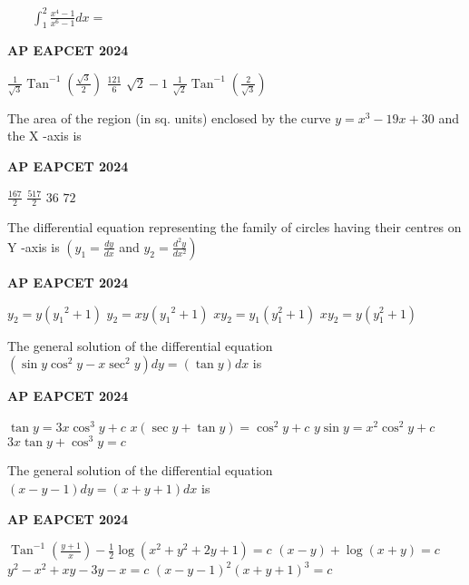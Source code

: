 \documentclass[11pt,paper=a4,answers]{exam}
\begin{document}
\begin{multicols}{2}
\begin{questions}
$\begin{aligned} & \\ &  \\ & \\ & \end{aligned}$
\question
$\int_1^2 \frac{x^4-1}{x^6-1} d x=$
\begin{flushright}
\small\textbf{AP EAPCET 2024}
\end{flushright}
\begin{choices}
  \choice $\frac{1}{\sqrt{3}} \operatorname{Tan}^{-1}\left(\frac{\sqrt{3}}{2}\right)$
  \choice $\frac{121}{6} $ 
  \choice $\sqrt{2}-1$ 
  \choice $\frac{1}{\sqrt{2}} \operatorname{Tan}^{-1}\left(\frac{2}{\sqrt{3}}\right)$
\end{choices}

\question
The area of the region (in sq. units) enclosed by the curve $y=x^3-19 x+30$ and the X -axis is
\begin{flushright}
\small\textbf{AP EAPCET 2024}
\end{flushright}
\begin{choices}
  \choice $\frac{167}{2}$ 
  \choice $\frac{517}{2}$ 
  \choice $36$ 
  \choice $72$
\end{choices}

\question
The differential equation representing the family of circles having their centres on Y -axis is $\left(y_1=\frac{d y}{d x}\right.$ and $\left.y_2=\frac{d^2 y}{d x^2}\right)$
\begin{flushright}
\small\textbf{AP EAPCET 2024}
\end{flushright}
\begin{choices}
  \choice $y_2=y\left(y_1{ }^2+1\right)$
  \choice $y_2=x y\left(y_1{ }^2+1\right) $ 
  \choice $ x y_2=y_1\left(y_1^2+1\right)$ 
  \choice $ x y_2=y\left(y_1^2+1\right)$
\end{choices}

\question
The general solution of the differential equation $\left(\sin y \cos ^2 y-x \sec ^2 y\right) d y=(\tan y) d x$ is
\begin{flushright}
\small\textbf{AP EAPCET 2024}
\end{flushright}
\begin{choices}
  \choice $\tan y=3 x \cos ^3 y+c $
  \choice $x(\sec y+\tan y)=\cos ^2 y+c$ 
  \choice $ y \sin y=x^2 \cos ^2 y+c$ 
  \choice $3 x \tan y+\cos ^3 y=c$
\end{choices}

\question
The general solution of the differential equation $(x-y-1) d y=(x+y+1) d x$ is
\begin{flushright}
\small\textbf{AP EAPCET 2024}
\end{flushright}
\begin{choices}
  \choice $\operatorname{Tan}^{-1}\left(\frac{y+1}{x}\right)-\frac{1}{2} \log \left(x^2+y^2+2 y+1\right)=c$
  \choice $(x-y)+\log (x+y)=c$ 
  \choice $y^2-x^2+x y-3 y-x=c $ 
  \choice $(x-y-1)^2(x+y+1)^3=c$
\end{choices}


\end{questions}
\end{multicols}
\end{document}
